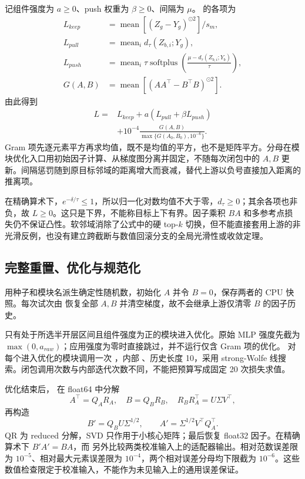 记组件强度为 $a\geq0$、push 权重为 $\beta\geq0$、间隔为 $\mu$。 的各项为
\begin{align}
 L_{keep}&=\operatorname{mean}[(Z_g-Y_g)^{\odot 2}]/s_m,\\
 L_{pull}&=\operatorname{mean}_i d_\tau(Z_{b,i};Y_g),\\
 L_{push}&=\operatorname{mean}_i\tau\operatorname{softplus}
 \!\left(\frac{\mu-d_\tau(Z_{b,i};Y_b)}{\tau}\right),\\
 G(A,B)&=\operatorname{mean}[(AA^\top-B^\top B)^{\odot 2}].
 \label{eq:local-terms}
\end{align}
由此得到
\begin{equation}
 \begin{aligned}
 L={}&L_{keep}+a(L_{pull}+\beta L_{push})\\
    &+10^{-4}\frac{G(A,B)}{\max\{G(A_0,B_0),10^{-6}\}}.
 \end{aligned}
 \label{eq:local-total}
\end{equation}
Gram 项先逐元素平方再求均值，既不是均值的平方，也不是矩阵平方。分母在模块优化入口用初始因子计算、从梯度图分离并固定，不随每次闭包中的 $A,B$ 更新。间隔惩罚随到原目标邻域的距离增大而衰减，替代上游以负号直接加入距离的推离项。

在精确算术下，$e^{-\delta/\tau}\leq1$，所以归一化对数均值不大于零，$d_\tau\geq0$；其余各项也非负，故 $L\geq0$。这只是下界，不能称目标上下有界。因子乘积 $BA$ 和多参考点损失仍不保证凸性。软邻域消除了公式中的硬 top-$k$ 切换，但不能直接套用上游的非光滑反例，也没有建立跨截断与数值回滚分支的全局光滑性或收敛定理。

\subsection{完整重置、优化与规范化}

 用种子和模块名派生确定性随机数，初始化 $A$ 并令 $B=0$，保存两者的 CPU 快照。每次试次由  恢复全部 $A,B$ 并清空梯度，故不会继承上游仅清零 $B$ 的因子历史。

只有处于所选半开层区间且组件强度为正的模块进入优化。原始 MLP 强度先截为 $\max(0,a_{raw})$；应用强度为零时直接跳过，并不运行仅含 Gram 项的优化。 对每个进入优化的模块调用一次 ，内部 、历史长度 10，采用 strong-Wolfe 线搜索。闭包调用次数与内部迭代次数不同，不能把预算写成固定 20 次损失求值。

优化结束后， 在 float64 中分解
\begin{equation}
 A^\top=Q_A R_A,\quad B=Q_B R_B,\quad
 R_B R_A^\top=U\Sigma V^\top,
\end{equation}
再构造
\begin{equation}
 B'=Q_B U\Sigma^{1/2},\qquad
 A'=\Sigma^{1/2}V^\top Q_A^\top.
 \label{eq:local-canonical}
\end{equation}
QR 为 reduced 分解，SVD 只作用于小核心矩阵；最后恢复 float32 因子。在精确算术下 $B'A'=BA$，而  另外比较两类校准输入上的适配器输出。相对范数误差限为 $10^{-5}$、相对最大元素误差限为 $10^{-4}$，两个相对误差分母均下限截为 $10^{-6}$。这些数值检查限定于校准输入，不能作为未见输入上的通用误差保证。

